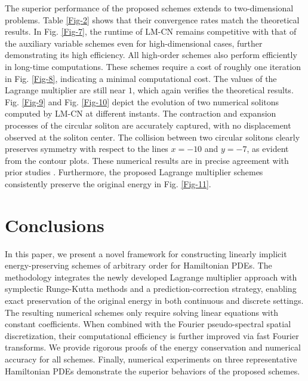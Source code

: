 \documentclass[onefignum,onetabnum]{siamart}
\begin{document}
The superior performance of the proposed schemes extends to two-dimensional problems. Table \ref{Fig-2} shows that their convergence rates match the theoretical results. In Fig. \ref{Fig-7}, the runtime of LM-CN remains competitive with that of the auxiliary variable schemes even for high-dimensional cases, further demonstrating its high efficiency. All high-order schemes also perform efficiently in long-time computations. These schemes require a cost of roughly one iteration in Fig. \ref{Fig-8}, indicating a minimal computational cost. The values of the Lagrange multiplier are still near $1$, which again verifies the theoretical results. Fig. \ref{Fig-9} and Fig. \ref{Fig-10} depict the evolution of two numerical solitons computed by LM-CN at different instants. The contraction and expansion processes of the circular soliton are accurately captured, with no displacement observed at the soliton center. The collision between two circular solitons clearly preserves symmetry with respect to the lines $x=-10$ and $y=-7$, as evident from the contour plots. These numerical results are in precise agreement with prior studies \cite{bo-22-EIEQ-MS,cai-19-SG-NB-JCP,jiang-19-SG-IEQ-JSC}. Furthermore, the proposed Lagrange multiplier schemes consistently preserve the original energy in Fig. \ref{Fig-11}.

\section{Conclusions}\label{sec:conclusions}
In this paper, we present a novel framework for constructing linearly implicit energy-preserving schemes of arbitrary order for Hamiltonian PDEs. The methodology integrates the newly developed Lagrange multiplier approach with symplectic Runge-Kutta methods and a prediction-correction strategy, enabling exact preservation of the original energy in both continuous and discrete settings. The resulting numerical schemes only require solving linear equations with constant coefficients. When combined with the Fourier pseudo-spectral spatial discretization, their computational efficiency is further improved via fast Fourier transforms. We provide rigorous proofs of the energy conservation and numerical accuracy for all schemes. Finally, numerical experiments on three representative Hamiltonian PDEs demonstrate the superior behaviors of the proposed schemes.



\end{document}
